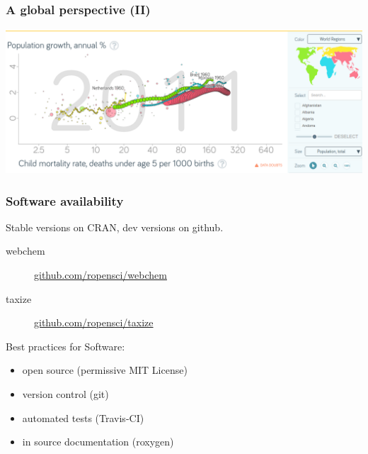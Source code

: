 \documentclass[
	10pt
	]{beamer}
\begin{document}
{%
\begin{frame}
\frametitle{A global perspective (II)}
	\includegraphics[width=1.1\textwidth, keepaspectratio]{figs/pop_mort.png}
\end{frame}
}


{%
\begin{frame}
\frametitle{Software availability}
	Stable versions on CRAN, dev versions on github.
	\begin{description}
		\item[webchem]{\url{github.com/ropensci/webchem}}
		\item[taxize]{\url{github.com/ropensci/taxize}}
	\end{description}
	\vspace{1em}

Best practices for Software:
	\begin{itemize}
		\item open source (permissive MIT License)
		\item version control (git)
		\item automated tests (Travis-CI)
		\item in source documentation (roxygen)
	\end{itemize}
\end{frame}
}


\end{document}
